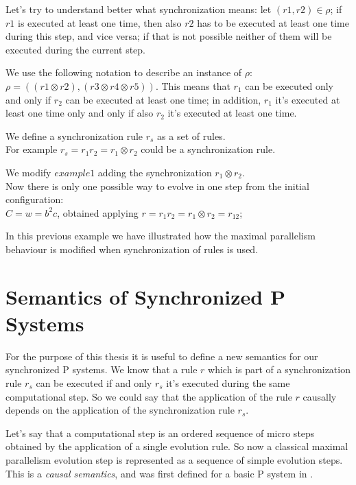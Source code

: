 Let's try to understand better what synchronization means:
let $(r1,r2) \in \rho$; if $r1$ is executed at least one time, then also
$r2$ has to be executed at least one time during this step, and vice versa; if that is not possible neither of them will be executed during the current step.

We use the following notation to describe an instance of $\rho$: 
$\rho=((r1 \otimes r2),(r3 \otimes r4 \otimes r5))$.
This means that $r_1$ can be executed only and only if $r_2$ can be executed at least one time;
in addition, $r_1$ it's executed at least one time only and only if also $r_2$ it's executed at least one time.

\begin{definition}
\label{def:sync_rule}
We define a synchronization rule $r_s$ as a set of rules.\\
For example $r_s=r_1 r_2 = r_1 \otimes r_2$ could be a synchronization rule.
\end{definition}

\begin{example}
    We modify \hyperref[ex:flat_membrane]{$example 1$} adding the synchronization 
    $r_1 \otimes r_2$.\\
    Now there is only one possible way to evolve in one step from the initial configuration:\\
    $C=w=b^2c$, obtained applying $r=r_1 r_2=r_1 \otimes r_2=r_{12}$;
\end{example}

In this previous example we have illustrated how the maximal parallelism behaviour is modified when synchronization of rules is used.

\section{Semantics of Synchronized P Systems}

For the purpose of this thesis it is useful to define a new semantics for our synchronized P systems.
We know that a rule $r$ which is part of a synchronization rule $r_s$ can be executed if and only $r_s$ it's executed during the same computational step. 
So we could say that the application of the rule $r$ causally depends on the application of the synchronization rule $r_s$.\newline

Let's say that a computational step is an ordered sequence of micro steps obtained by the application of a single evolution rule.
So now a classical maximal parallelism evolution step is represented as a sequence of simple evolution steps.
This is a \textit{causal semantics}, and was first defined for a basic P system in \cite{busi2007causality}.\newline

